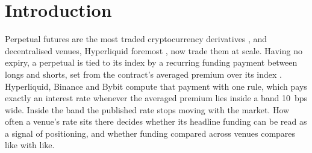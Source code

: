 \documentclass[10pt,a4paper]{article}
\begin{document}
\section{Introduction}\label{sec:intro}

Perpetual futures are the most traded cryptocurrency derivatives \citep{he2022perp}, and decentralised venues, Hyperliquid foremost \citep{lau2026carry}, now trade them at scale. Having no expiry, a perpetual is tied to its index by a recurring funding payment between longs and shorts, set from the contract's averaged premium over its index \citep{ackerer2024,hyperliquid_funding_docs}. Hyperliquid, Binance and Bybit compute that payment with one rule, which pays exactly an interest rate whenever the averaged premium lies inside a band 10~bps wide. Inside the band the published rate stops moving with the market. How often a venue's rate sits there decides whether its headline funding can be read as a signal of positioning, and whether funding compared across venues compares like with like.
\end{document}
